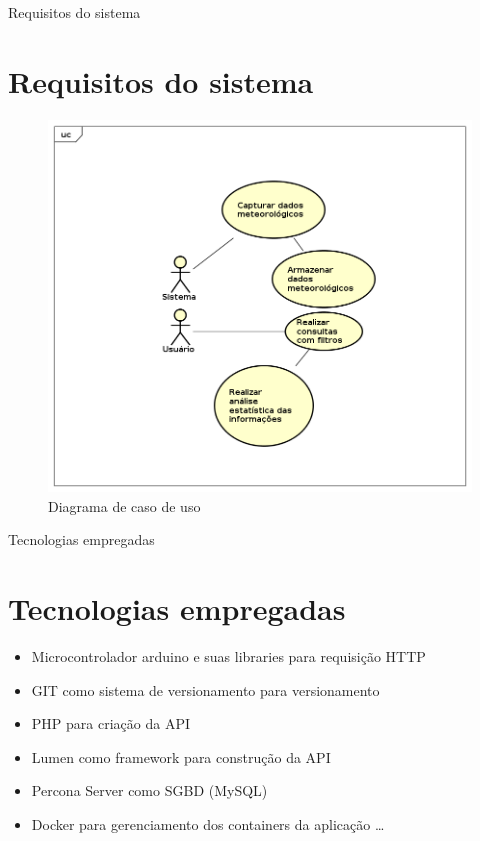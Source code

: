 \documentclass[aspectratio=43]{beamer}
\begin{document}
\begin{frame}{Requisitos do sistema}
\section{Requisitos do sistema}

\begin{figure}[!htb]
    \label{figure_diagrama_caso_uso}
    \centering
    \caption{Diagrama de caso de uso} \label{includegraphics_diagrama_caso_uso}
    \includegraphics[scale=0.3]{caso_de_uso.png}
    \hfill
\end{figure}
\end{frame}

\begin{frame}{Tecnologias empregadas}
\section{Tecnologias empregadas}

\begin{itemize}
\item Microcontrolador arduino e suas libraries para requisição HTTP
\item GIT como sistema de versionamento para versionamento
\item PHP para criação da API
\item Lumen como framework para construção da API
\item Percona Server como SGBD (MySQL)
\item Docker para gerenciamento dos containers da aplicação \ldots
\end{itemize}
\end{frame}
\end{document}
